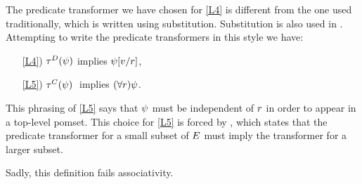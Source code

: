 \begin{example}
  The predicate transformer we have chosen for \ref{L4} is different from the
  one used traditionally, which is written using substitution.  Substitution
  is also used in \jjr{}.  Attempting to
  write the predicate transformers in this style we have:
  \begin{enumerate}
  \item[\ref{L4})]
    $\aTr{\bEvs}{\bForm}$ implies $\psi[v/r]$, 
  \item[\ref{L5})]
    $\aTr{\cEvs}{\bForm}\;$ implies $(\forall r)\psi$.
  \end{enumerate}
  This phrasing of \ref{L5} says that $\psi$ must be independent of $r$
  in order to appear in a top-level pomset.  This choice for \ref{L5} is forced
  by , which states that the predicate transformer for a
  small subset of $E$ must imply the transformer for a larger subset.

  Sadly, this definition fails associativity.


\end{example}
